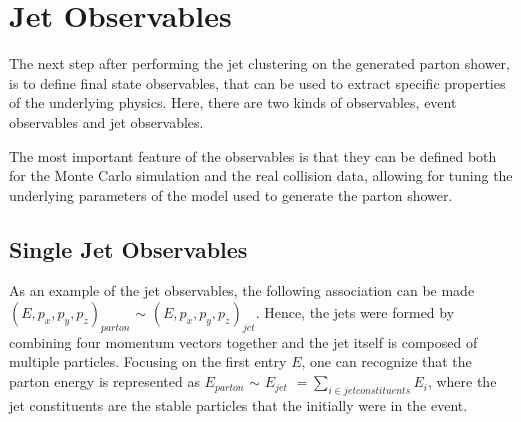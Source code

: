 \chapter{Jet Observables}

The next step after performing the jet clustering on the generated parton shower, is to define final state observables, that can be used to extract specific properties of the underlying physics. Here, there are two kinds of observables, event observables and jet observables.  

The most important feature of the observables is that they can be defined both for the Monte Carlo simulation and the real collision data, allowing for tuning the underlying parameters of the model used to generate the parton shower. 
\section{Single Jet Observables}


As an example of the jet observables, the following association can be made $(E, p_x, p_y, p_z)_{parton}$ $\sim$ $(E, p_x, p_y, p_z)_{jet}$. Hence, the jets were formed by combining four momentum vectors together and the jet itself is composed of multiple particles. Focusing on the first entry $E$, one can recognize that the parton energy is represented as $E_{parton}$ $\sim$ $E_{jet}$  $= \sum_{i \in jet constituents} E_{i}$,
where the jet constituents are the stable particles that the initially were in the event.

